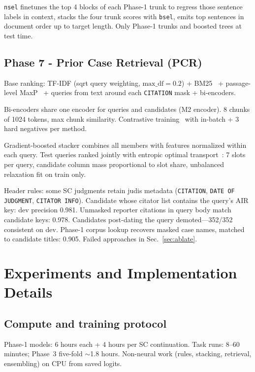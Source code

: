\documentclass[11pt, oneside]{article}
\begin{document}
\texttt{nsel} finetunes the top 4 blocks of each Phase-1 trunk to regress those sentence labels in
context, stacks the four trunk scores with \texttt{bsel}, emits top sentences in document order up to
target length. Only Phase-1 trunks and boosted trees at test time.

\subsection{Phase 7 - Prior Case Retrieval (PCR)}
Base ranking: TF-IDF (sqrt query weighting, $\text{max\_df}=0.2$) + BM25~\citep{robertson2009bm25} +
passage-level MaxP~\citep{dai2019maxp} + queries from text around each \texttt{CITATION} mask +
bi-encoders.

Bi-encoders share one encoder for queries and candidates (M2 encoder). 8 chunks of 1024 tokens, max
chunk similarity. Contrastive training~\citep{oord2018cpc} with in-batch + 3 hard negatives per method.

Gradient-boosted stacker combines all members with features normalized within each query. Test queries
ranked jointly with entropic optimal transport~\citep{cuturi2013sinkhorn}: 7 slots per query, candidate
column mass proportional to slot share, unbalanced relaxation fit on train only.

Header rules: some SC judgments retain judis metadata (\texttt{CITATION}, \texttt{DATE OF JUDGMENT},
\texttt{CITATOR INFO}). Candidate whose citator list contains the query's AIR key: dev precision 0.981.
Unmasked reporter citations in query body match candidate keys: 0.978. Candidates post-dating the query
demoted---352/352 consistent on dev. Phase-1 corpus lookup recovers masked case names, matched to
candidate titles: 0.905. Failed approaches in Sec.~\ref{sec:ablate}.

\section{Experiments and Implementation Details}
\subsection{Compute and training protocol}
Phase-1 models: 6 hours each + 4 hours per SC continuation. Task runs: 8--60 minutes; Phase~3 five-fold
$\sim$1.8 hours. Non-neural work (rules, stacking, retrieval, ensembling) on CPU from saved logits.
\end{document}
